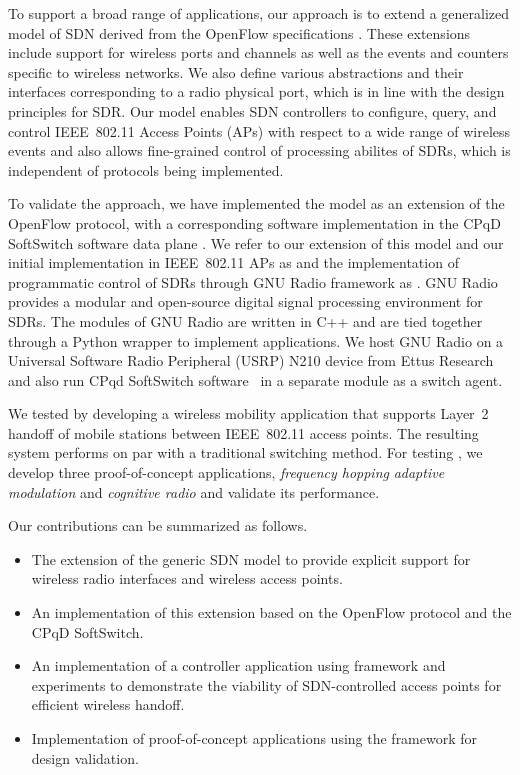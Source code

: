 To support a broad range of applications, our approach is to extend a generalized model of SDN derived from the OpenFlow specifications \cite{Casey:14}.  These extensions include support for wireless ports and channels as well as the events and counters specific to wireless networks. We also define various abstractions and their interfaces corresponding to a radio physical port, which is in line with the design principles for SDR. Our model enables SDN controllers to configure, query, and control IEEE~802.11 Access Points (APs) with respect to a wide range of wireless events and also allows fine-grained control of processing abilites of SDRs, which is independent of protocols being implemented. 

To validate the approach, we have implemented the model as an extension of the OpenFlow protocol, with a corresponding software implementation in the CPqD SoftSwitch software data plane \cite{ofsoftswitch13}. We refer to our extension of this model and our initial implementation in IEEE~802.11 APs as {\em \aetherflow} and the implementation of programmatic control of SDRs through GNU Radio \cite{gnuradio} framework as {\em \crossflow}. GNU Radio provides a modular and open-source digital signal processing environment for SDRs. The modules of GNU Radio are written in C++ and are tied together through a Python wrapper to implement applications. We host GNU Radio on a Universal Software Radio Peripheral (USRP) N210 device from Ettus Research and also run CPqd SoftSwitch software~\cite{ofsoftswitch13} in a separate module as a switch agent.

We tested {\em \aetherflow} by developing a wireless mobility application that supports Layer~2 handoff of mobile stations between IEEE~802.11 access points. The resulting system performs on par with a traditional switching method. For testing {\em \crossflow}, we develop three proof-of-concept applications, \emph{frequency hopping} \emph{adaptive modulation} and \emph{cognitive radio} and validate its performance.

Our contributions can be summarized as follows.

\begin{itemize}
\item The extension of the generic SDN model to provide explicit support for wireless radio interfaces and wireless access points.

\item An implementation of this extension based on the OpenFlow protocol and the CPqD SoftSwitch.

\item An implementation of a controller application using \aetherflow framework and experiments to demonstrate the viability of SDN-controlled access points for
efficient wireless handoff.

\item Implementation of proof-of-concept  applications using the \crossflow framework for design validation.
\end{itemize}

